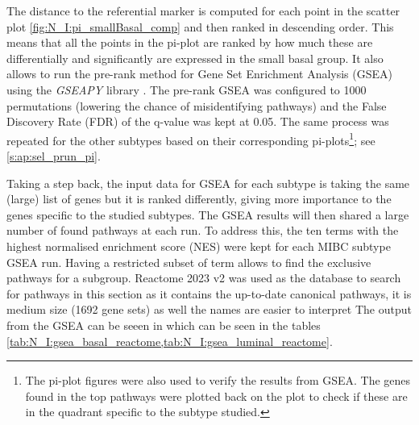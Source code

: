 The distance to the referential marker is computed for each point in the scatter plot \cref{fig:N_I:pi_smallBasal_comp} and then ranked in descending order. This means that all the points in the pi-plot are ranked by how much these are differentially and significantly are expressed in the small basal group. It also allows to run the pre-rank method for Gene Set Enrichment Analysis (GSEA) using the \textit{GSEAPY} library \citet{Fang2023-ec}. The pre-rank GSEA was configured to 1000 permutations (lowering the chance of misidentifying pathways) and the False Discovery Rate (FDR) of the q-value was kept at 0.05. The same process was repeated for the other subtypes based on their corresponding pi-plots\footnote{The pi-plot figures were also used to verify the results from GSEA. The genes found in the top pathways were plotted back on the plot to check if these are in the quadrant specific to the subtype studied.}; see \cref{s:ap:sel_prun_pi}.

Taking a step back, the input data for GSEA for each subtype is taking the same (large) list of genes but it is ranked differently, giving more importance to the genes specific to the studied subtypes. The GSEA results will then shared a large number of found pathways at each run. To address this, the ten terms with the highest normalised enrichment score (NES) were kept for each MIBC subtype GSEA run. Having a restricted subset of term allows to find the exclusive pathways for a subgroup. Reactome 2023 v2 was used as the database to search for pathways in this section as it contains the up-to-date canonical pathways, it is medium size (1692 gene sets) as well the names are easier to interpret The output from the GSEA can be seeen in which can be seen in the tables \cref{tab:N_I:gsea_basal_reactome,tab:N_I:gsea_luminal_reactome}.

